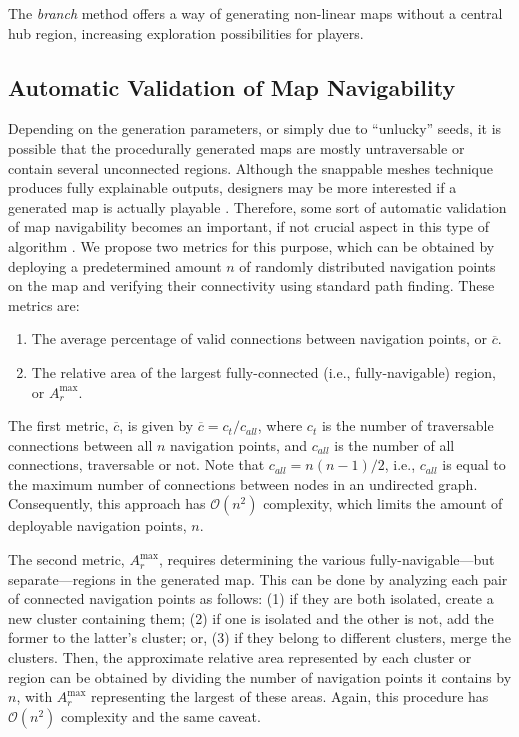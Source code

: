 \documentclass[journal]{IEEEtran}
\begin{document}
The \textit{branch} method offers a way of generating non-linear maps without a central hub
region, increasing exploration possibilities for players.

\subsection{Automatic Validation of Map Navigability}
\label{sec:methods:valid}

Depending on the generation parameters, or simply due to ``unlucky'' seeds, it is possible
that the procedurally generated maps are mostly untraversable or contain several unconnected
regions. Although the snappable meshes technique produces fully explainable outputs, designers
may be more interested if a generated map is actually playable \cite{zhu2018explainable}.
Therefore, some sort of automatic validation of map navigability becomes an important, if
not crucial aspect in this type of algorithm \cite{lelis2017procedural}. We propose two
metrics for this purpose, which can be obtained by deploying a predetermined amount $n$ of
randomly distributed navigation points on the map and verifying their connectivity using
standard path finding. These metrics are:

\begin{enumerate}
    \item The average percentage of valid connections between navigation points, or
        $\overline{c}$.
    \item The relative area of the largest fully-connected (i.e., fully-navigable) region, or
        $A_r^\text{max}$.
\end{enumerate}

The first metric, $\overline{c}$, is given by $\overline{c}=c_t/c_{all}$, where $c_t$ is the
number of traversable connections between all $n$ navigation points, and $c_{all}$ is the
number of all connections, traversable or not. Note that $c_{all}=n(n-1)/2$, i.e., $c_{all}$
is equal to the maximum number of connections between nodes in an undirected graph.
Consequently, this approach has $\mathcal{O}(n^2)$ complexity, which limits the amount of
deployable navigation points, $n$.

The second metric, $A_r^\text{max}$, requires determining the various
fully-navigable---but separate---regions in the generated map. This can be done by analyzing
each pair of connected navigation points as follows: (1) if they are both isolated, create a
new cluster containing them; (2) if one is isolated and the other is not, add the former to
the latter's cluster; or, (3) if they
belong to different clusters, merge the clusters. Then, the approximate relative area
represented by each cluster or region can be obtained by dividing the number of navigation
points it contains by $n$, with $A_r^\text{max}$ representing the largest of these areas. Again,
this procedure has $\mathcal{O}(n^2)$ complexity and the same caveat.
\end{document}
